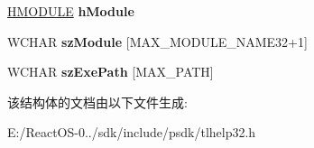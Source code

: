 \begin{DoxyCompactItemize}
\hyperlink{interfacevoid}{H\+M\+O\+D\+U\+LE} {\bfseries h\+Module}
\item 
\mbox{\label{structtag_m_o_d_u_l_e_e_n_t_r_y32_w_a277dc844c2969cf912360193bfcf4679}} 
W\+C\+H\+AR {\bfseries sz\+Module} \mbox{[}M\+A\+X\+\_\+\+M\+O\+D\+U\+L\+E\+\_\+\+N\+A\+M\+E32+1\mbox{]}
\item 
\mbox{\label{structtag_m_o_d_u_l_e_e_n_t_r_y32_w_a3eba28eec1ef1218f5300b229727d82e}} 
W\+C\+H\+AR {\bfseries sz\+Exe\+Path} \mbox{[}M\+A\+X\+\_\+\+P\+A\+TH\mbox{]}
\end{DoxyCompactItemize}


该结构体的文档由以下文件生成\+:\begin{DoxyCompactItemize}
\item 
E\+:/\+React\+O\+S-\/0../sdk/include/psdk/tlhelp32.\+h\end{DoxyCompactItemize}
